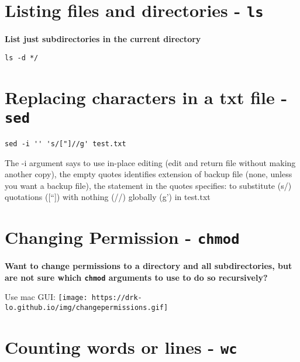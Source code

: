 \documentclass[
  letterpaper,
  DIV=11,
  numbers=noendperiod]{scrreprt}
\begin{document}
\hypertarget{listing-files-and-directories---ls}{%
\section*{\texorpdfstring{\textbf{Listing files and directories -
\texttt{ls}}}{Listing files and directories - ls}}\label{listing-files-and-directories---ls}}

\textbf{List just subdirectories in the current directory}

\begin{verbatim}
ls -d */
\end{verbatim}

\hypertarget{replacing-characters-in-a-txt-file--sed}{%
\section*{\texorpdfstring{\textbf{Replacing characters in a txt file
-\texttt{sed}}}{Replacing characters in a txt file -sed}}\label{replacing-characters-in-a-txt-file--sed}}

\begin{verbatim}
sed -i '' 's/["]//g' test.txt
\end{verbatim}

The -i argument says to use in-place editing (edit and return file
without making another copy), the empty quotes identifies extension of
backup file (none, unless you want a backup file), the statement in the
quotes specifies: to substitute (s/) quotations ({[}``{]}) with nothing
(//) globally (g') in test.txt

\hypertarget{changing-permission---chmod}{%
\section*{\texorpdfstring{\textbf{Changing Permission -
\texttt{chmod}}}{Changing Permission - chmod}}\label{changing-permission---chmod}}

\textbf{Want to change permissions to a directory and all
subdirectories, but are not sure which \texttt{chmod} arguments to use
to do so recursively?}

Use mac GUI:
\texttt{[image: https://drk-lo.github.io/img/changepermissions.gif]}

\hypertarget{counting-words-or-lines---wc}{%
\section*{\texorpdfstring{\textbf{Counting words or lines -
\texttt{wc}}}{Counting words or lines - wc}}\label{counting-words-or-lines---wc}}
\end{document}
